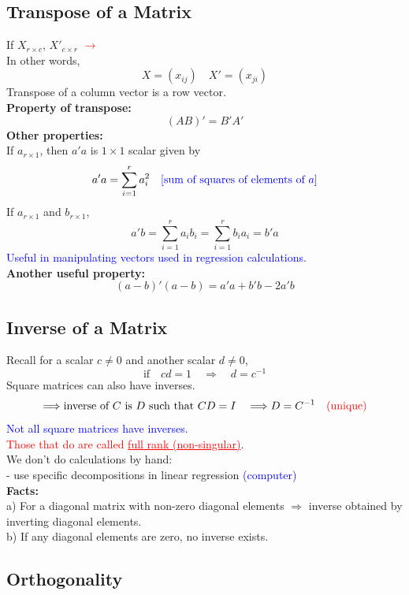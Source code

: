 \documentclass[14pt]{extarticle}
\begin{document}
\subsection*{Transpose of a Matrix}
\noindent
If $X_{r \times c}$, $X'_{c \times r }$ \textcolor{red}{$\rightarrow$}\\
In other words,
\[
X = (x_{ij}) \quad X' = (x_{ji})
\]
Transpose of a column vector is a row vector.\\
\textbf{Property of transpose:}
\[
(AB)' = B' A'
\]
\textbf{Other properties:}\\
If $a_{r \times 1}$, then $a' a$ is $1 \times 1$ scalar given by
\[
a' a = \sum_{i=1}^{r} a_i^2
\quad \textcolor{blue}{\left[ \text{sum of squares of elements of } a \right]}
\]
If $a_{r \times 1}$ and $b_{r \times 1}$,
\[
a' b = \sum_{i=1}^{r} a_i b_i = \sum_{i=1}^{r} b_i a_i = b' a
\]
\textcolor{blue}{Useful in manipulating vectors used in regression calculations.}\\
\textbf{Another useful property:}
\[
(a - b)' (a - b) = a'a + b'b - 2a'b
\]

\subsection*{Inverse of a Matrix}

\noindent
Recall for a scalar $c \neq 0$ and another scalar $d \neq 0$,
\[
\text{if} \quad cd = 1 \quad \Longrightarrow \quad d = c^{-1}
\]
Square matrices can also have inverses.
\[
\Longrightarrow \text{inverse of } C \text{ is } D \text{ such that } CD = I \quad \Longrightarrow D = C^{-1} \quad \textcolor{red}{\text{(unique)}}
\]
\textcolor{blue}{Not all square matrices have inverses.} \\
\textcolor{red}{Those that do are called \underline{full rank (non-singular)}}.\\
We don't do calculations by hand: \\
- use specific decompositions in linear regression \textcolor{blue}{(computer)}\\
\textbf{Facts:}\\
a) For a diagonal matrix with non-zero diagonal elements
$\Rightarrow$ inverse obtained by inverting diagonal elements.\\
b) If any diagonal elements are zero, no inverse exists.\\

\subsection*{Orthogonality}
\end{document}
